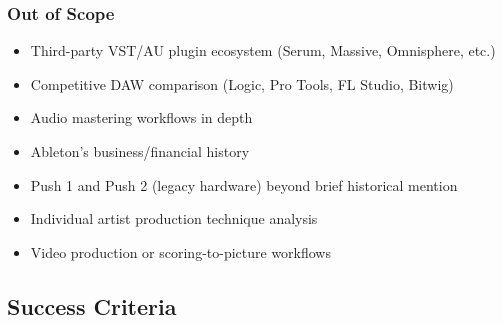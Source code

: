 \documentclass[11pt,letterpaper]{article}
\begin{document}
\subsubsection{Out of Scope}
\begin{itemize}[leftmargin=1.5em]
  \item Third-party VST/AU plugin ecosystem (Serum, Massive, Omnisphere, etc.)
  \item Competitive DAW comparison (Logic, Pro Tools, FL Studio, Bitwig)
  \item Audio mastering workflows in depth
  \item Ableton's business/financial history
  \item Push 1 and Push 2 (legacy hardware) beyond brief historical mention
  \item Individual artist production technique analysis
  \item Video production or scoring-to-picture workflows
\end{itemize}

\subsection{Success Criteria}
\end{document}
